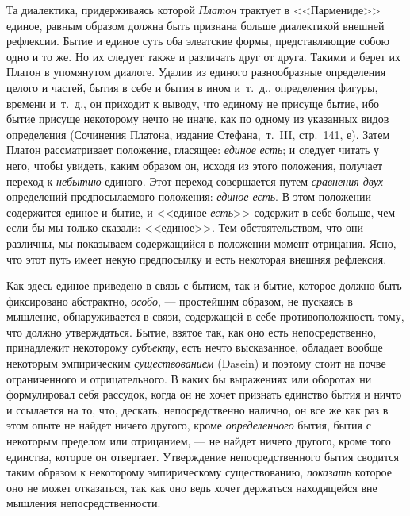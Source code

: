 Та диалектика, придерживаясь которой {\em Платон}
трактует в <<Пармениде>> единое, равным образом должна быть признана больше
диалектикой внешней рефлексии. Бытие и единое суть оба элеатские формы,
представляющие собою одно и то же. Но их следует также и различать друг от
друга. Такими и берет их Платон в упомянутом диалоге. Удалив из единого
разнообразные определения целого и частей, бытия в себе и бытия в ином
и~т.~д., определения фигуры, времени и~т.~д., он приходит к выводу, что
единому не присуще бытие, ибо бытие присуще некоторому нечто не иначе, как
по одному из указанных видов определения (Сочинения Платона, издание
Стефана,~т.~III,
стр.~141, е). Затем Платон рассматривает
положение, гласящее: {\em единое}
{\em есть}; и следует читать у него, чтобы увидеть,
каким образом он, исходя из этого положения, получает переход к
{\em небытию} единого. Этот переход совершается путем
{\em сравнения двух} определений предпосылаемого
положения: {\em единое есть}. В этом положении
содержится единое и бытие, и <<единое {\em есть}>>
содержит в себе больше, чем если бы мы только сказали: <<единое>>. Тем
обстоятельством, что они различны, мы показываем содержащийся в положении
момент отрицания. Ясно, что этот путь имеет некую предпосылку и есть
некоторая внешняя рефлексия.

Как здесь единое приведено в связь с бытием, так и бытие, которое должно
быть фиксировано абстрактно, {\em особо}, --- простейшим
образом, не пускаясь в мышление, обнаруживается в связи, содержащей в себе
противоположность тому, что должно утверждаться. Бытие, взятое так, как оно
есть непосредственно, принадлежит некоторому
{\em субъекту}, есть нечто высказанное, обладает вообще
некоторым эмпирическим {\em существованием} (Dasein) и
поэтому стоит на почве ограниченного и отрицательного. В каких бы
выражениях или оборотах ни формулировал себя рассудок, когда он не хочет
признать единство бытия и ничто и ссылается на то, что, дескать,
непосредственно налично, он все же как раз в этом опыте не найдет ничего
другого, кроме {\em определенного} бытия, бытия с
некоторым пределом или отрицанием, --- не найдет ничего другого, кроме того
единства, которое он отвергает. Утверждение непосредственного бытия
сводится таким образом к некоторому эмпирическому существованию,
{\em показать} которое оно не может отказаться, так как
оно ведь хочет держаться находящейся вне мышления непосредственности.

